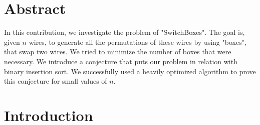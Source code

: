 \documentclass[11pt, a4paper]{article}
\begin{document}
\section{Abstract}
In this contribution, we investigate the problem of "SwitchBoxes".
The goal is, given $n$ wires, to generate all the permutations of these wires by using "boxes", that swap two wires. We tried to minimize the number of boxes that were necessary.
We introduce a conjecture that puts our problem in relation with binary insertion sort. We successfully used a heavily optimized algorithm to prove this conjecture for small values of $n$.

\section{Introduction}
\end{document}
